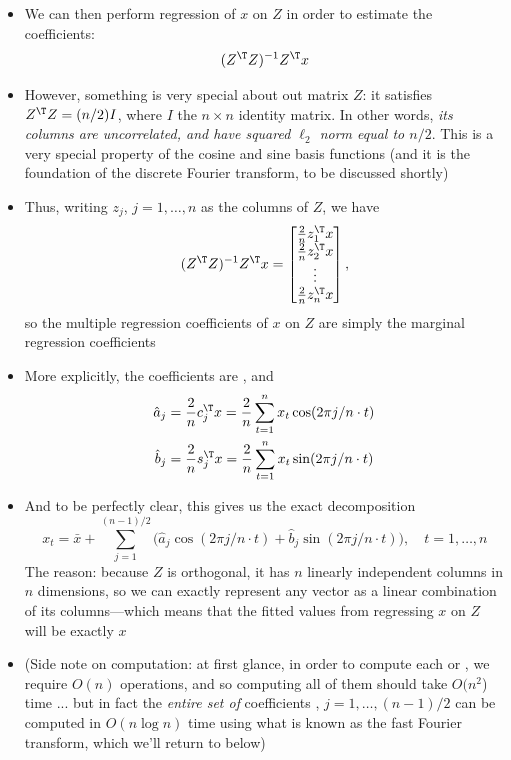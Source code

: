 \documentclass{article}
\begin{document}
\begin{itemize}
\item We can then perform regression of $x$ on $Z$ in order to estimate the
  coefficients: 
  \[
  (Z^\T Z)^{-1} Z^\T x
  \]

\item However, something is very special about out matrix $Z$: it satisfies 
  $Z^\T Z = (n/2) I$, where $I$ the $n \times n$ identity matrix. In other
  words, \emph{its columns are uncorrelated, and have squared $\ell_2$ norm
    equal to $n/2$}. This is a very special property of the cosine and sine
  basis functions (and it is the foundation of the discrete Fourier transform, 
  to be discussed shortly)
    
\item Thus, writing $z_j$, $j = 1,\dots,n$ as the columns of $Z$, we have
  \renewcommand{\arraystretch}{1.3} 
  \[
  (Z^\T Z)^{-1} Z^\T x = \begin{bmatrix} \frac{2}{n} z_1^\T x \\ \frac{2}{n}
    z_2^\T x \\ \vdots \\ \frac{2}{n} z_n^\T  x \end{bmatrix},
  \]
 \renewcommand{\arraystretch}{1} 
  so the multiple regression coefficients of $x$ on $Z$ are simply the marginal
  regression coefficients

\item More explicitly, the coefficients are , and   
  \begin{equation}
  \label{eq:fourier_coef}
  \begin{aligned}
  \hat{a}_j &= \frac{2}{n} c_j^\T x = \frac{2}{n} \sum_{t=1}^n x_t \cos(2\pi j/n
  \cdot t) \\
  \hat{b}_j &= \frac{2}{n} s_j^\T x = \frac{2}{n} \sum_{t=1}^n x_t \sin(2\pi j/n
  \cdot t) 
  \end{aligned}
  \end{equation}

\item And to be perfectly clear, this gives us the exact decomposition 
  \begin{equation}
  \label{eq:fourier_decomp}
  x_t = \bar{x} + \sum_{j=1}^{(n-1)/2} \Big( \hat{a}_j \cos(2\pi j/n \cdot t) + 
  \hat{b}_j \sin(2\pi j/n \cdot t) \Big), \quad t = 1,\dots,n 
  \end{equation}
  The reason: because $Z$ is orthogonal, it has $n$ linearly independent
  columns in $n$ dimensions, so we can exactly represent any vector as a linear
  combination of its columns---which means that the fitted values from
  regressing $x$ on $Z$ will be exactly $x$  

\item (Side note on computation: at first glance, in order to compute each
   or , we require $O(n)$ operations, and 
  so computing all of them should take $O(n^2$) time ... but in fact the
  \emph{entire set of} coefficients , $j =
  1,\dots,(n-1)/2$ can be computed in $O(n \log{n})$ time using what is known as
  the fast Fourier transform, which we'll return to below)
\end{itemize}
\end{document}
